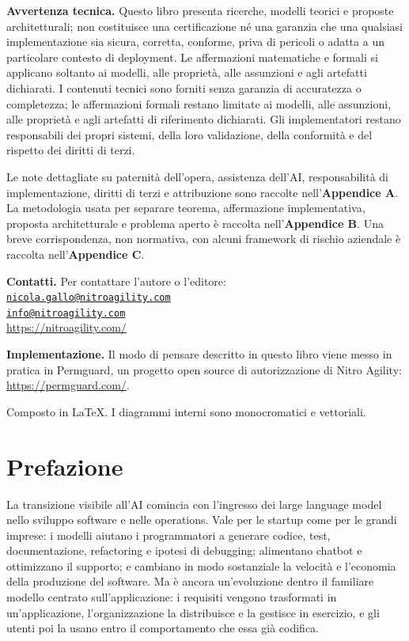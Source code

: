 \documentclass[10pt,oneside,openany]{book}
\begin{document}
{\textbf{Avvertenza tecnica.} Questo libro presenta ricerche, modelli teorici e proposte architetturali; non costituisce una certificazione né una garanzia che una qualsiasi implementazione sia sicura, corretta, conforme, priva di pericoli o adatta a un particolare contesto di deployment. Le affermazioni matematiche e formali si applicano soltanto ai modelli, alle proprietà, alle assunzioni e agli artefatti dichiarati. I contenuti tecnici sono forniti senza garanzia di accuratezza o completezza; le affermazioni formali restano limitate ai modelli, alle assunzioni, alle proprietà e agli artefatti di riferimento dichiarati. Gli implementatori restano responsabili dei propri sistemi, della loro validazione, della conformità e del rispetto dei diritti di terzi.\par

Le note dettagliate su paternità dell'opera, assistenza dell'AI, responsabilità di implementazione, diritti di terzi e attribuzione sono raccolte nell'\textbf{Appendice A}. La metodologia usata per separare teorema, affermazione implementativa, proposta architetturale e problema aperto è raccolta nell'\textbf{Appendice B}. Una breve corrispondenza, non normativa, con alcuni framework di rischio aziendale è raccolta nell'\textbf{Appendice C}.\par

\textbf{Contatti.} Per contattare l'autore o l'editore:\\
\href{mailto:nicola.gallo@nitroagility.com}{\nolinkurl{nicola.gallo@nitroagility.com}}\\
\href{mailto:info@nitroagility.com}{\nolinkurl{info@nitroagility.com}}\\
\url{https://nitroagility.com/}\par

\textbf{Implementazione.} Il modo di pensare descritto in questo libro viene messo in pratica in Permguard, un progetto open source di autorizzazione di Nitro Agility: \url{https://permguard.com/}.\par
}

\vfill
{\footnotesize Composto in LaTeX. I diagrammi interni sono monocromatici e vettoriali.}
\clearpage

\chapter*{Prefazione}
La transizione visibile all'AI comincia con l'ingresso dei large language model nello sviluppo software e nelle operations. Vale per le startup come per le grandi imprese: i modelli aiutano i programmatori a generare codice, test, documentazione, refactoring e ipotesi di debugging; alimentano chatbot e ottimizzano il supporto; e cambiano in modo sostanziale la velocità e l'economia della produzione del software. Ma è ancora un'evoluzione dentro il familiare modello centrato sull'applicazione: i requisiti vengono trasformati in un'applicazione, l'organizzazione la distribuisce e la gestisce in esercizio, e gli utenti poi la usano entro il comportamento che essa già codifica.
\end{document}
